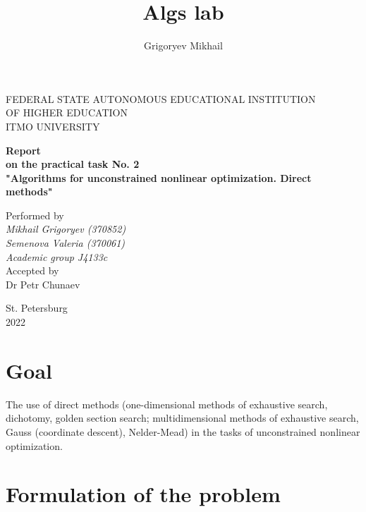 \documentclass[12pt, a4paper]{article}
\author{Grigoryev Mikhail}
\title{Algs lab}
\begin{document}
\thispagestyle{empty}

\vspace{30mm}

\begin{center}
FEDERAL STATE AUTONOMOUS EDUCATIONAL INSTITUTION \\
OF HIGHER EDUCATION \\
ITMO UNIVERSITY

\vspace{40mm}

{\large \textbf{Report \\
on the practical task No. 2 \\
"Algorithms for unconstrained nonlinear optimization. Direct methods"}}
\end{center}

\vspace{15mm}

\begin{flushright}
{\large Performed by \\
\textit{Mikhail Grigoryev (370852) \\
Semenova Valeria (370061) \\
Academic group J4133c \\}
Accepted by \\
Dr Petr Chunaev}
\end{flushright}

\vspace{100mm}

\begin{center}
St. Petersburg \\
2022
\end{center}

\newpage

\section*{Goal}

The use of direct methods (one-dimensional methods of exhaustive search, dichotomy, golden section search; multidimensional methods of exhaustive search, Gauss (coordinate descent), Nelder-Mead) in the tasks of unconstrained nonlinear optimization.

\section*{Formulation of the problem}
\end{document}
